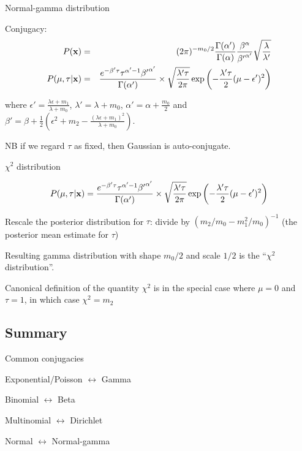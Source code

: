 \documentclass{beamer}
\begin{document}
\begin{frame}{Normal-gamma distribution}

\itemb
\item Conjugacy:
\begin{eqnarray*}
P({\bf x}) & = & (2\pi)^{-m_0/2} \frac{\Gamma(\alpha')}{\Gamma(\alpha)} \frac{\beta^\alpha}{{\beta'}^{\alpha'}} \sqrt{\frac{\lambda}{\lambda'}} \\
P(\mu,\tau|{\bf x}) & = & 
\frac{e^{-\beta' \tau} \tau^{\alpha'-1} {\beta'}^{\alpha'}}{\Gamma(\alpha')} \times
\sqrt{\frac{\lambda' \tau}{2\pi}} \exp\left( -\frac{\lambda' \tau}{2}(\mu-\epsilon')^2 \right)
\end{eqnarray*}

where
$\epsilon' = \frac{\lambda\epsilon + m_1}{\lambda + m_0}$,
$\lambda' = \lambda + m_0$,
$\alpha' = \alpha + \frac{m_0}{2}$ and
$\beta' = \beta + \frac{1}{2}\left( \epsilon^2 + m_2 - \frac{(\lambda\epsilon + m_1)^2}{\lambda + m_0} \right)$.
\item NB if we regard $\tau$ as fixed, then Gaussian is auto-conjugate.
\iteme

\end{frame}

\begin{frame}{$\chi^2$ distribution}

\[
P(\mu,\tau|{\bf x}) = 
\frac{e^{-\beta' \tau} \tau^{\alpha'-1} {\beta'}^{\alpha'}}{\Gamma(\alpha')} \times
\sqrt{\frac{\lambda' \tau}{2\pi}} \exp\left( -\frac{\lambda' \tau}{2}(\mu-\epsilon')^2 \right)
\]

\itemb
\item Rescale the posterior distribution for $\tau$:
divide by $(m_2/m_0 - m_1^2/m_0)^{-1}$
(the posterior mean estimate for $\tau$)
\item Resulting gamma distribution with shape $m_0/2$ and scale $1/2$
is the ``$\chi^2$ distribution''.
\item Canonical definition of the quantity $\chi^2$
is in the special case where $\mu=0$ and $\tau=1$,
in which case $\chi^2=m_2$
\iteme

\end{frame}

\subsection{Summary}

\begin{frame}{Common conjugacies}

\itemb
\item Exponential/Poisson $\leftrightarrow$ Gamma
\item Binomial $\leftrightarrow$ Beta
\item Multinomial $\leftrightarrow$ Dirichlet
\item Normal $\leftrightarrow$ Normal-gamma
\iteme

\end{frame}
\end{document}

